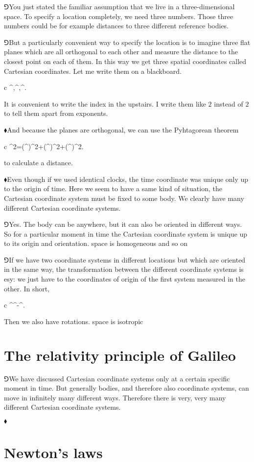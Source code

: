 \documentclass[10pt,oneside%
]{memoir}
\newenvironment{eqna}{\begin{IEEEeqnarray*}{c}}{\end{IEEEeqnarray*}\ignorespacesafterend}
\renewcommand{\vec}[1]{\mathbf{#1}}
\newcommand{\ind}[1]{\mathfrak{#1}}
\newcommand{\coa}{{\color{black}\bullet}}
\newcommand{\hea}{\(\blacklozenge\)\;}
\newcommand{\heb}{\(\Game\)\;}
\begin{document}
\heb You just stated the familiar assumption that we live in a three-dimensional space. To specify a location completely, we need three numbers. Those three numbers could be for example distances to three different reference bodies.

\heb But a particularly convenient way to specify the location is to imagine three flat planes which are all orthogonal to each other and measure the distance to the closest point on each of them. In this way we get three spatial coordinates called Cartesian coordinates. Let me write them on a blackboard.
\begin{eqna}
	\vec{x}^\ind{1},\quad\vec{x}^\ind{2},\quad\vec{x}^\ind{3}.
\end{eqna}
It is convenient to write the index in the upstairs. I write them like \(\ind{2}\) instead of \(2\) to tell them apart from exponents.

\hea And because the planes are orthogonal, we can use the Pyhtagorean theorem
\begin{eqna}
	\Delta\vec{x}^2=(\Delta\vec{x}^\ind{1})^2+(\Delta\vec{x}^\ind{2})^2+(\Delta\vec{x}^\ind{3})^2.
\end{eqna}
to calculate a distance.

\hea Even though if we used identical clocks, the time coordinate was unique only up to the origin of time. Here we seem to have a same kind of situation, the Cartesian coordinate system must be fixed to some body. We clearly have many different Cartesian coordinate systems.

\heb Yes. The body can be anywhere, but it can also be oriented in different ways. So for a particular moment in time the Cartesian coordinate system is unique up to its origin and orientation. space is homogeneous and so on

\heb If we have two coordinate systems in different locations but which are oriented in the same way, the transformation between the different coordinate systems is esy: we just have to the coordinates of origin of the first system measured in the other. In short, 
\begin{eqna}
	\vec{x}^\coa\rightarrow\vec{x}^\coa-\Delta\vec{x}^\coa.
\end{eqna}
Then we also have rotations. space is isotropic
\section{The relativity principle of Galileo}
\heb We have discussed Cartesian coordinate systems only at a certain specific moment in time. But generally bodies, and therefore also coordinate systems, can move in infinitely many different ways. Therefore there is very, very many different Cartesian coordinate systems.

\hea

\section{Newton's laws}










%
\end{document}
